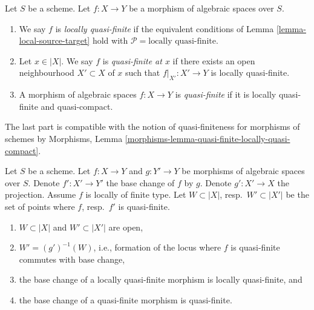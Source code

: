 \begin{definition}
\label{definition-locally-quasi-finite}
Let $S$ be a scheme.
Let $f : X \to Y$ be a morphism of algebraic spaces over $S$.
\begin{enumerate}
\item We say $f$ is
{\it locally quasi-finite} if the equivalent conditions of
Lemma \ref{lemma-local-source-target} hold with
$\mathcal{P} = \text{locally quasi-finite}$.
\item Let $x \in |X|$. We say $f$ is {\it quasi-finite at $x$}
if there exists an open neighbourhood $X' \subset X$ of $x$ such
that $f|_{X'} : X' \to Y$ is locally quasi-finite.
\item A morphism of algebraic spaces $f : X \to Y$ is
{\it quasi-finite} if it is locally quasi-finite and quasi-compact.
\end{enumerate}
\end{definition}

\noindent
The last part is compatible with the notion of quasi-finiteness for morphisms
of schemes by
Morphisms, Lemma \ref{morphisms-lemma-quasi-finite-locally-quasi-compact}.

\begin{lemma}
\label{lemma-base-change-quasi-finite-locus}
Let $S$ be a scheme. Let $f : X \to Y$ and $g : Y' \to Y$ be morphisms
of algebraic spaces over $S$. Denote $f' : X' \to Y'$ the base change
of $f$ by $g$. Denote $g' : X' \to X$ the projection.
Assume $f$ is locally of finite type.
Let $W \subset |X|$, resp.\ $W' \subset |X'|$
be the set of points where $f$, resp.\ $f'$ is quasi-finite.
\begin{enumerate}
\item $W \subset |X|$ and $W' \subset |X'|$ are open,
\item $W' = (g')^{-1}(W)$, i.e., formation of the locus where
$f$ is quasi-finite commutes with base change,
\item the base change of a locally quasi-finite morphism is
locally quasi-finite, and
\item the base change of a quasi-finite morphism is quasi-finite.
\end{enumerate}
\end{lemma}

